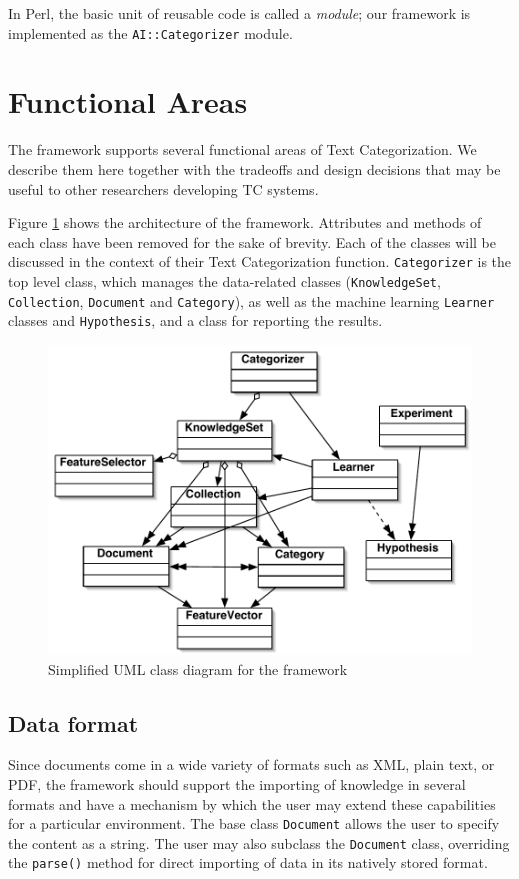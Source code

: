 \documentclass[twocolumn]{article}
\begin{document}
In Perl, the basic unit of reusable code is called a \emph{module};
our framework is implemented as the \texttt{AI::Categorizer} module.

\section{Functional Areas}

The framework supports several functional areas of Text
Categorization. We describe them here together with the tradeoffs and
design decisions that may be useful to other researchers developing TC
systems.

Figure \ref{classes-uml} shows the architecture of the
framework. Attributes and methods of each class have been removed for
the sake of brevity. Each of the classes will be discussed in the
context of their Text Categorization function. \texttt{Categorizer} is
the top level class, which manages the data-related classes
(\texttt{KnowledgeSet}, \texttt{Collection}, \texttt{Document} and
\texttt{Category}), as well as the machine learning \texttt{Learner}
classes and \texttt{Hypothesis}, and a class for reporting the
results.


\begin{figure}
\includegraphics[width=\linewidth]{classes-uml.pdf}
\caption{Simplified UML class diagram for the framework}
\label{classes-uml}
\end{figure}

\subsection*{Data format}
Since documents come in a wide variety of formats such as XML, plain text,
or PDF, the framework should support the
importing of knowledge in several formats and have a mechanism by
which the user may extend these capabilities for a particular
environment.  The base class \texttt{Document} allows the user to
specify the content as a string.  The user may also subclass the
\texttt{Document} class, overriding the \texttt{parse()} method for
direct importing of data in its natively stored format.
\end{document}
